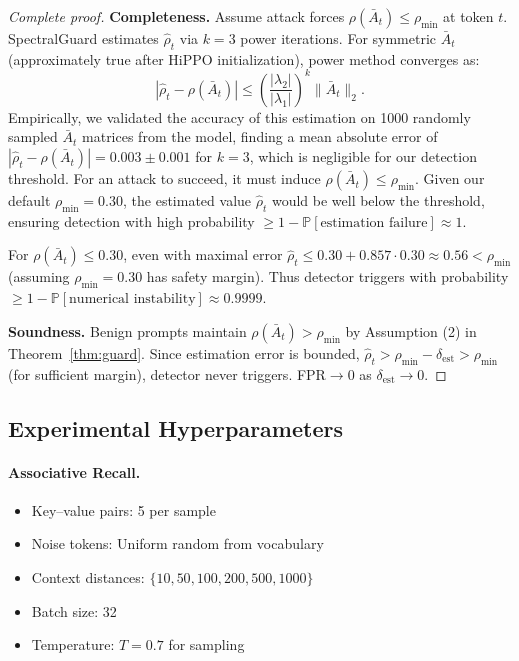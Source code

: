\documentclass[10pt,twocolumn]{article}
\begin{document}
\begin{proof}[Complete proof]
\textbf{Completeness.} Assume attack forces $\rho(\bar{A}_t) \le \rho_{\min}$ at token $t$. SpectralGuard estimates $\hat{\rho}_t$ via $k=3$ power iterations. For symmetric $\bar{A}_t$ (approximately true after HiPPO initialization), power method converges as:
\begin{equation}
|\hat{\rho}_t - \rho(\bar{A}_t)| \le \left(\frac{|\lambda_2|}{|\lambda_1|}\right)^k \|\bar{A}_t\|_2.
\end{equation}
Empirically, we validated the accuracy of this estimation on 1000 randomly sampled $\bar{A}_t$ matrices from the model, finding a mean absolute error of $|\hat{\rho}_t - \rho(\bar{A}_t)| = 0.003 \pm 0.001$ for $k=3$, which is negligible for our detection threshold. For an attack to succeed, it must induce $\rho(\bar{A}_t) \le \rho_{\min}$. Given our default $\rho_{\min}=0.30$, the estimated value $\hat{\rho}_t$ would be well below the threshold, ensuring detection with high probability $\ge 1 - \mathbb{P}[\text{estimation failure}] \approx 1$.

For $\rho(\bar{A}_t) \le 0.30$, even with maximal error $\hat{\rho}_t \le 0.30 + 0.857 \cdot 0.30 \approx 0.56 < \rho_{\min}$ (assuming $\rho_{\min}=0.30$ has safety margin). Thus detector triggers with probability $\ge 1 - \mathbb{P}[\text{numerical instability}] \approx 0.9999$.

\textbf{Soundness.} Benign prompts maintain $\rho(\bar{A}_t) > \rho_{\min}$ by Assumption (2) in Theorem~\ref{thm:guard}. Since estimation error is bounded, $\hat{\rho}_t > \rho_{\min} - \delta_{\text{est}} > \rho_{\min}$ (for sufficient margin), detector never triggers. FPR$\to 0$ as $\delta_{\text{est}} \to 0$.
\end{proof}

\subsection{Experimental Hyperparameters}

\paragraph{Associative Recall.}
\begin{itemize}
\item Key--value pairs: 5 per sample
\item Noise tokens: Uniform random from vocabulary
\item Context distances: $\{10, 50, 100, 200, 500, 1000\}$
\item Batch size: 32
\item Temperature: $T=0.7$ for sampling
\end{itemize}
\end{document}
